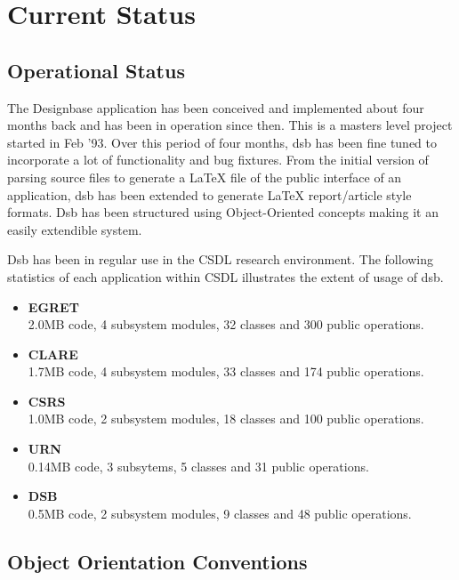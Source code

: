 \section{Current Status}

\subsection{Operational Status}

The Designbase application has been conceived and implemented about
four months back and has been in operation since then.  This is a
masters level project started in Feb '93.  Over this period of four
months, dsb has been fine tuned to incorporate a lot of functionality
and bug fixtures.  From the initial version of parsing source files to
generate a LaTeX file of the public interface of an application, dsb
has been extended to generate LaTeX report/article style formats.  Dsb
has been structured using Object-Oriented concepts making it an easily
extendible system.

Dsb has been in regular use in the CSDL research environment.  The
following statistics of each application within CSDL illustrates the
extent of usage of dsb.
\begin{itemize}
\item {\bf EGRET}\\ 2.0MB code, 4 subsystem modules, 32 classes and
300 public operations. \cite{csdl-93-02}
\item {\bf CLARE}\\ 1.7MB code, 4 subsystem modules, 33 classes and
174 public operations. \cite{csdl-clare-doc}
  
\item {\bf CSRS}\\ 1.0MB code, 2 subsystem modules, 18 classes and 100
public operations. \cite{csdl-csrs-doc}
  
\item {\bf URN}\\ 0.14MB code, 3 subsytems, 5 classes and 31 public
operations. \cite{csdl-urn-doc}
  
\item {\bf DSB}\\ 0.5MB code, 2 subsystem modules, 9 classes and
 48 public operations. \cite{csdl-dsb-doc}

\end{itemize}


\subsection{Object Orientation Conventions}

